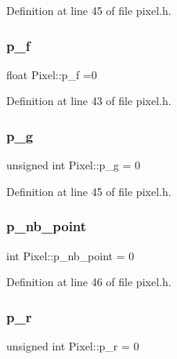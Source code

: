 Definition at line 45 of file pixel.\+h.

\mbox{\label{class_pixel_a7deda5be756322a5c31f6c2da641fd23}} 
\subsubsection{\texorpdfstring{p\+\_\+f}{p\_f}}
{\footnotesize\ttfamily float Pixel\+::p\+\_\+f =0}



Definition at line 43 of file pixel.\+h.

\mbox{\label{class_pixel_ab57c1d8eb36e078122374f40101648b4}} 
\subsubsection{\texorpdfstring{p\+\_\+g}{p\_g}}
{\footnotesize\ttfamily unsigned int Pixel\+::p\+\_\+g = 0}



Definition at line 45 of file pixel.\+h.

\mbox{\label{class_pixel_ad6e3f83bd8d6894e3e7516a19fcef096}} 
\subsubsection{\texorpdfstring{p\+\_\+nb\+\_\+point}{p\_nb\_point}}
{\footnotesize\ttfamily int Pixel\+::p\+\_\+nb\+\_\+point = 0}



Definition at line 46 of file pixel.\+h.

\mbox{\label{class_pixel_a837be2857d4fba78615f2fb78e28e67d}} 
\subsubsection{\texorpdfstring{p\+\_\+r}{p\_r}}
{\footnotesize\ttfamily unsigned int Pixel\+::p\+\_\+r = 0}




